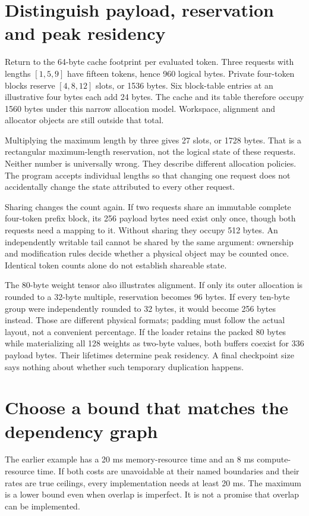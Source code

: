 \section{Distinguish payload, reservation and peak residency}
Return to the 64-byte cache footprint per evaluated token. Three requests
with lengths $[1,5,9]$ have fifteen tokens, hence 960 logical bytes.
Private four-token blocks reserve $[4,8,12]$ slots, or 1536 bytes.
Six block-table entries at an illustrative four bytes each add 24 bytes.
The cache and its table therefore occupy 1560 bytes under this narrow
allocation model. Workspace, alignment and allocator objects are still
outside that total.

Multiplying the maximum length by three gives 27 slots, or 1728 bytes.
That is a rectangular maximum-length reservation, not the logical
state of these requests. Neither number is universally wrong.
They describe different allocation policies. The program accepts
individual lengths so that changing one request does not accidentally
change the state attributed to every other request.

Sharing changes the count again. If two requests share an immutable
complete four-token prefix block, its 256 payload bytes need exist only
once, though both requests need a mapping to it. Without sharing they
occupy 512 bytes. An independently writable tail cannot be shared by
the same argument: ownership and modification rules decide whether a
physical object may be counted once. Identical token counts alone do not
establish shareable state.

The 80-byte weight tensor also illustrates alignment. If only its outer
allocation is rounded to a 32-byte multiple, reservation becomes 96 bytes.
If every ten-byte group were independently rounded to 32 bytes, it would
become 256 bytes instead. Those are different physical formats; padding
must follow the actual layout, not a convenient percentage.
If the loader retains the packed 80 bytes while materializing all 128
weights as two-byte values, both buffers coexist for 336 payload bytes.
Their lifetimes determine peak residency. A final checkpoint size says
nothing about whether such temporary duplication happens.

\section{Choose a bound that matches the dependency graph}
The earlier example has a 20 ms memory-resource time and an 8 ms
compute-resource time. If both costs are unavoidable at their named
boundaries and their rates are true ceilings, every implementation
needs at least 20 ms. The maximum is a lower bound even when overlap
is imperfect. It is not a promise that overlap can be implemented.

